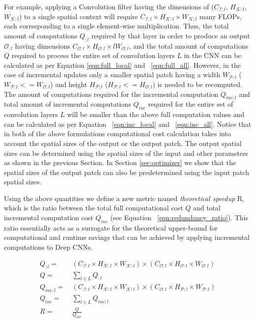 For example, applying a Convolution filter having the dimensions of ($C_{\mathcal{I}:l}$, $H_{\mathcal{K}:l}$, $W_{\mathcal{K}:l}$) to a single spatial context will require $C_{\mathcal{I}:l} \times H_{\mathcal{K}:l} \times W_{\mathcal{K}:l}$ many FLOPs, each corresponding to a single element-wise multiplication.
Thus, the total amount of computations $Q_{:l}$ required by that layer in order to produce an output $\mathcal{O}_{:l}$ having dimensions $C_{\mathcal{O}:l} \times H_{\mathcal{O}:l} \times lW_{\mathcal{O}:l}$, and the total amount of computations $Q$ required to process the entire set of convolution layers $L$ in the CNN can be calculated as per Equation \ref{eqn:full_local} and ~\ref{eqn:full_all}.
However, in the case of incremental updates only a smaller spatial patch having a width $W_{\mathcal{P}:l}$ ($W_{\mathcal{P}:l}<=W_{\mathcal{O}:l}$) and height $H_{\mathcal{P}:l}$ ($H_{\mathcal{P}:l}<=H_{\mathcal{O}:l}$) is needed to be recomputed.
The amount of computations required for the incremental computation $Q_{inc:l}$ and total amount of incremental computations $Q_{inc}$ required for the entire set of convolution layers $L$ will be smaller than the above full computation values and can be calculated as per Equation ~\ref{eqn:inc_local} and ~\ref{eqn:inc_all}.
Notice that in both of the above formulations computational cost calculation takes into account the spatial sizes of the output or the output patch.
The output spatial sizes can be determined using the spatial sizes of the input and other parameters as shown in the previous Section.
In Section \ref{sec:optimizer} we show that the spatial sizes of the output patch can also be predetermined using the input patch spatial sizes.

Using the above quantities we define a new metric named \textit{theoretical speedup} R, which is the ratio between the total full computational cost $Q$ and total incremental computation cost $Q_{inc}$ (see Equation ~\ref{eqn:redundancy_ratio}).
This ratio essentially acts as a surrogate for the theoretical upper-bound for computational and runtime savings that can be achieved by applying incremental computations to Deep CNNs.

\begin{align}
\label{eqn:full_local}
Q_{:l} =&~ (C_{\mathcal{I}:l} \times H_{\mathcal{K}:l} \times W_{\mathcal{K}:l}) \times (C_{\mathcal{O}:l} \times H_{\mathcal{O}:l} \times W_{\mathcal{O}:l})\\
\label{eqn:full_all}
Q =&~ \sum_{l \in L}Q_{:l}\\
\label{eqn:inc_local}
Q_{inc:l} =&~ (C_{\mathcal{I}:l} \times H_{\mathcal{K}:l} \times W_{\mathcal{K}:l}) \times (C_{\mathcal{O}:l} \times H_{\mathcal{P}:l} \times W_{\mathcal{P}:l})\\
\label{eqn:inc_all}
Q_{inc} =&~ \sum_{l \in L} Q_{inc:l}\\
\label{eqn:redundancy_ratio}
R =&~ \frac{Q}{Q_{inc}}
\end{align}


